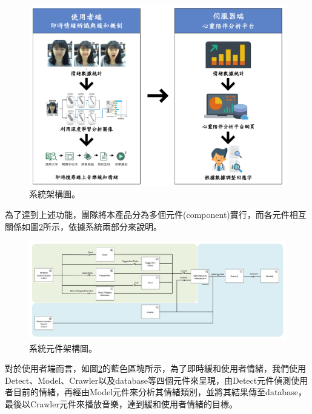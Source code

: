 \documentclass[12pt]{scrreprt}
\begin{document}
\begin{figure}[!h]
\begin{center}
\includegraphics[width=1\textwidth]{./figs/diagrams/UserAndServer.pdf}
\end{center}
\caption{系統架構圖。}
\label{fig:UserAndServer}
\end{figure}

為了達到上述功能，團隊將本產品分為多個元件(component)實行，而各元件相互關係如圖\ref{fig:ComponentDiagram}所示，依據系統兩部分來說明。

\begin{figure}[!h]
\begin{center}
\includegraphics[width=1\textwidth]{./figs/diagrams/ComponentDiagram.pdf}
\end{center}
\caption{系統元件架構圖。}
\label{fig:ComponentDiagram}
\end{figure}

對於使用者端而言，如圖\ref{fig:ComponentDiagram}的藍色區塊所示，為了即時緩和使用者情緒，我們使用Detect、Model、Crawler以及database等四個元件來呈現，由Detect元件偵測使用者目前的情緒，再經由Model元件來分析其情緒類別，並將其結果傳至database，最後以Crawler元件來播放音樂，達到緩和使用者情緒的目標。
\end{document}
